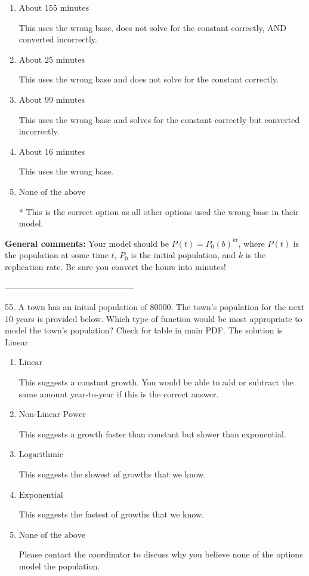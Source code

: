\documentclass{extbook}[14pt]
\begin{document}
\begin{enumerate}[label=\Alph*.] 
\item $ \text{About } 155 \text{ minutes} $ 

 This uses the wrong base, does not solve for the constant correctly, AND converted incorrectly. 
\item $ \text{About } 25 \text{ minutes} $ 

 This uses the wrong base and does not solve for the constant correctly. 
\item $ \text{About } 99 \text{ minutes} $ 

 This uses the wrong base and solves for the constant correctly but converted incorrectly. 
\item $ \text{About } 16 \text{ minutes} $ 

 This uses the wrong base. 
\item $ \text{None of the above} $ 

 * This is the correct option as all other options used the wrong base in their model. 
\end{enumerate} 
 
\textbf{General comments:} Your model should be $P(t) = P_0(b)^{kt}$, where $P(t)$ is the population at some time $t$, $P_0$ is the initial population, and $k$ is the replication rate. Be sure you convert the hours into minutes!

-----------------------------------------------

55. A town has an initial population of 80000. The town's population for the next 10 years is provided below. Which type of function would be most appropriate to model the town's population?
Check for table in main PDF. 
The solution is $ \text{Linear} $ 

\begin{enumerate}[label=\Alph*.] 
\item $ \text{Linear} $ 

 This suggests a constant growth. You would be able to add or subtract the same amount year-to-year if this is the correct answer. 
\item $ \text{Non-Linear Power} $ 

 This suggests a growth faster than constant but slower than exponential. 
\item $ \text{Logarithmic} $ 

 This suggests the slowest of growths that we know. 
\item $ \text{Exponential} $ 

 This suggests the fastest of growths that we know. 
\item $ \text{None of the above} $ 

 Please contact the coordinator to discuss why you believe none of the options model the population. 
\end{enumerate} 
 
\end{document}
